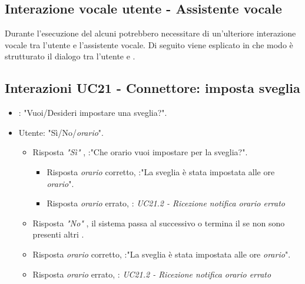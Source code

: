 \subsection{Interazione vocale utente - Assistente vocale}
\label{sec:iterazione_vocale_utente}
Durante l'esecuzione del  alcuni  potrebbero necessitare di un'ulteriore interazione vocale tra l'utente e l'assistente vocale. Di seguito viene esplicato in che modo è strutturato il dialogo tra l'utente e  .
\subsection{Interazioni UC21 - Connettore: imposta sveglia}
\label{sec:connettore_sveglia}
\begin{itemize}
        \item {}: "Vuoi/Desideri impostare una sveglia?".
        \item Utente: "Sì/No/{\it orario}".
        \begin{itemize}
         \item{Risposta {\it "Sì"} }, :"Che orario vuoi impostare per la sveglia?".
         \begin{itemize}
              \item{Risposta {\it orario} corretto}, :"La sveglia è stata impostata alle ore {\it orario}".
              \item{Risposta {\it orario} errato}, :  {\it UC21.2 - Ricezione notifica orario errato}
         \end{itemize}
         \item{Risposta {\it "No"} }, il sistema passa al  successivo o termina il  se non sono presenti altri .
         \item{Risposta {\it orario} corretto}, :"La sveglia è stata impostata alle ore {\it orario}".
         \item{Risposta {\it orario} errato}, :  {\it UC21.2 - Ricezione notifica orario errato}
         \end{itemize}
    \end{itemize}

